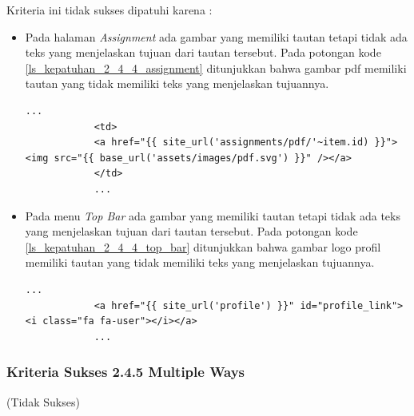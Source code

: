 \documentclass[a4paper,twoside]{article}
\begin{document}
\begin{enumerate}
		Kriteria ini tidak sukses dipatuhi karena :
		\begin{itemize}
			\item Pada halaman \textit{Assignment} ada gambar yang memiliki tautan tetapi tidak ada teks yang menjelaskan tujuan dari tautan tersebut. Pada potongan kode \ref{ls_kepatuhan_2_4_4_assignment} ditunjukkan bahwa gambar pdf memiliki tautan yang tidak memiliki teks yang menjelaskan tujuannya.
			\begin{lstlisting}[basicstyle=\ttfamily, frame=single,
			columns=fullflexible, keepspaces=true, breaklines=true, label=ls_kepatuhan_2_4_4_assignment, caption=Kriteria Sukses 2.4.4 - Gambar PDF]
			...
			<td>
			<a href="{{ site_url('assignments/pdf/'~item.id) }}"><img src="{{ base_url('assets/images/pdf.svg') }}" /></a>
			</td>
			...
			\end{lstlisting}
			
			\item Pada menu \textit{Top Bar} ada gambar yang memiliki tautan tetapi tidak ada teks yang menjelaskan tujuan dari tautan tersebut. Pada potongan kode \ref{ls_kepatuhan_2_4_4_top_bar} ditunjukkan bahwa gambar logo profil memiliki tautan yang tidak memiliki teks yang menjelaskan tujuannya.
			\begin{lstlisting}[basicstyle=\ttfamily, frame=single,
			columns=fullflexible, keepspaces=true, breaklines=true, label=ls_kepatuhan_2_4_4_top_bar, caption=Kriteria Sukses 2.4.4 - Gambar Logo Profile]
			...
			<a href="{{ site_url('profile') }}" id="profile_link"><i class="fa fa-user"></i></a>
			...
			\end{lstlisting}
			
		\end{itemize}
		
		\subsubsection*{Kriteria Sukses 2.4.5 Multiple Ways}
		\label{subsubsec:kepatuhan_kriteria_2.4.5}
		(Tidak Sukses) \\
		

\end{enumerate}
\end{document}

